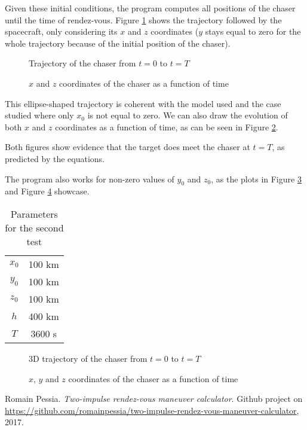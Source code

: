 \documentclass[journal]{IEEEtran}
\begin{document}
Given these initial conditions, the program computes all positions of the chaser until the time of rendez-vous. Figure \ref{plot:xz} shows the trajectory followed by the spacecraft, only considering its $x$ and $z$ coordinates ($y$ stays equal to zero for the whole trajectory because of the initial position of the chaser).
    \begin{figure}[htp!]
      \centering
      
      \caption{Trajectory of the chaser from $t=0$ to $t=T$}
      \label{plot:xz}
    \end{figure}

\begin{figure}[htp!]
  \centering
  
  \caption{$x$ and $z$ coordinates of the chaser as a function of time}
  \label{plot:xzt}
\end{figure}
This ellipse-shaped trajectory is coherent with the model used and the case studied where only $x_0$ is not equal to zero. We can also draw the evolution of both $x$ and $z$ coordinates as a function of time, as can be seen in Figure \ref{plot:xzt}.



Both figures show evidence that the target does meet the chaser at $t=T$, as predicted by the equations.

The program also works for non-zero values of $y_0$ and $z_0$, as the plots in Figure \ref{plot:3d} and Figure \ref{plot:xyz} showcase.

\begin{table}[h!]
\centering
 \begin{tabular}{| c | c |} 
 \hline
 $x_0$ & 100 \si{km}\\
 $y_0$ & 100 \si{km}\\
 $z_0$ & 100 \si{km}\\
 $h$ & 400 \si{km} \\
 $T$ & 3600 \si{s}\\
 \hline
\end{tabular}
\caption{Parameters for the second test}
\end{table}

\begin{figure}[htp!]
  \centering
  
  \caption{3D trajectory of the chaser from $t=0$ to $t=T$}
  \label{plot:3d}
\end{figure}

\begin{figure}[htp!]
  \centering
  
  \caption{$x$, $y$ and $z$ coordinates of the chaser as a function of time}
  \label{plot:xyz}
\end{figure}

\appendices

\begin{thebibliography}{9}
Romain Pessia. 
\textit{Two-impulse rendez-vous maneuver calculator}. 
Github project on \href{https://github.com/romainpessia/two-impulse-rendez-vous-maneuver-calculator}{https://github.com/romainpessia/two-impulse-rendez-vous-maneuver-calculator}, 2017.
\end{thebibliography}
\end{document}
